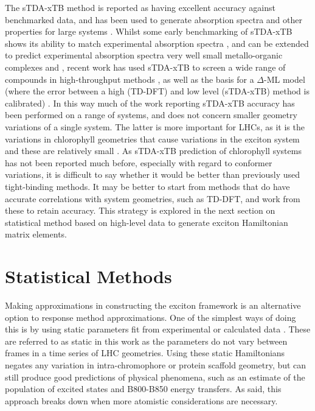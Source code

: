 The sTDA-xTB method is reported as having excellent accuracy against benchmarked
data, and has been used to generate absorption spectra and other properties for 
large systems \cite{Grimme2016, Seibert2019, Wilbraham2018, Verma2022, HeathApostolopoulos2019}. 
Whilst some early benchmarking of sTDA-xTB shows its ability to match experimental
absorption spectra \cite{Grimme2016}, and can be extended to predict experimental
absorption spectra very well small metallo-organic complexes and \cite{Seibert2019},
recent work has used sTDA-xTB to screen a wide range of compounds in high-throughput
methods \cite{Wilbraham2018}, as well as the basis for a $\Delta$-ML model (where
the error between a high (TD-DFT) and low level (sTDA-xTB) method is calibrated) \cite{Verma2022}.
In this way much of the work reporting sTDA-xTB accuracy has been performed on a 
range of systems, and does not concern smaller geometry variations of a single system. 
The latter is more important for LHCs, as it is the variations in chlorophyll geometries
that cause variations in the exciton system and these are relatively small \cite{Sirohiwal2020}.
As sTDA-xTB prediction of chlorophyll systems has not been reported much before, 
especially with regard to conformer variations, it is difficult to say whether it
would be better than previously used tight-binding methods. It may be better to start
from methods that do have accurate correlations with system geometries, such as
TD-DFT, and work from these to retain accuracy. This strategy is explored in the
next section on statistical method based on high-level data to generate exciton
Hamiltonian matrix elements.

\section{Statistical Methods}
\label{sec:stats_methods}

Making approximations in constructing the exciton framework is an alternative option
to response method approximations. One of the simplest ways of doing this is by 
using static parameters fit from experimental or calculated data \cite{Cory1998, Hu1997, Tretiak2000}. 
These are referred to as static in this work as the parameters do not vary between 
frames in a time series of LHC geometries. Using these static Hamiltonians negates
any variation in intra-chromophore or protein scaffold geometry, but can still produce
good predictions of physical phenomena, such as an estimate of the population of
excited states \cite{Cory1998, Hu1997} and B800-B850 energy transfers. As said, 
this approach breaks down when more atomistic considerations are necessary.

